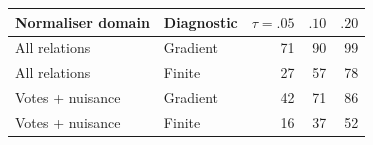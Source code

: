 \begin{tabular}{@{}llrrr@{}}
\toprule
Normaliser domain & Diagnostic & $\tau=.05$ & $.10$ & $.20$ \\
\midrule
All relations & Gradient & 71 & 90 & 99 \\
All relations & Finite & 27 & 57 & 78 \\
Votes + nuisance & Gradient & 42 & 71 & 86 \\
Votes + nuisance & Finite & 16 & 37 & 52 \\
\bottomrule
\end{tabular}
